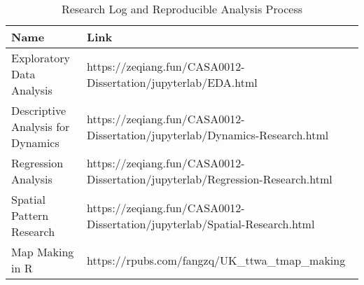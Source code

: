 \documentclass[
  12pt,
  oneside]{book}
\begin{document}
\begin{longtable}[t]{>{\raggedright\arraybackslash}p{4.5cm}>{\raggedright\arraybackslash}p{8.5cm}}
\caption{\label{tab:research-log}Research Log and Reproducible Analysis Process}\\
\toprule
\textbf{Name} & \textbf{Link}\\
\midrule
Exploratory Data Analysis & https://zeqiang.fun/CASA0012-Dissertation/jupyterlab/EDA.html\\
Descriptive Analysis for Dynamics & https://zeqiang.fun/CASA0012-Dissertation/jupyterlab/Dynamics-Research.html\\
Regression Analysis & https://zeqiang.fun/CASA0012-Dissertation/jupyterlab/Regression-Research.html\\
Spatial Pattern Research & https://zeqiang.fun/CASA0012-Dissertation/jupyterlab/Spatial-Research.html\\
Map Making in R & https://rpubs.com/fangzq/UK\_ttwa\_tmap\_making\\
\bottomrule
\end{longtable}

\enddocument

\printbibliography
\end{document}
